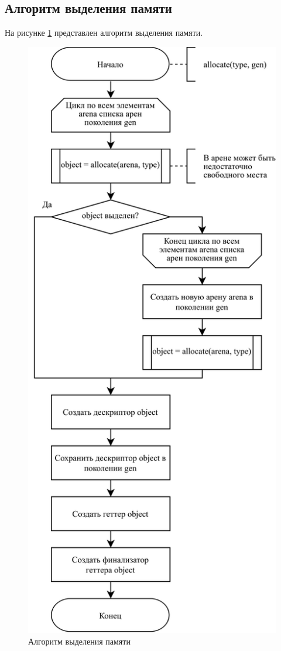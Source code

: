 \subsection{Алгоритм выделения памяти}

На рисунке \ref{fig:allocation} представлен алгоритм выделения памяти.

\begin{figure}[H]
	\centering
	\includegraphics[scale=0.19]{assets/allocate.png}
	\caption{Алгоритм выделения памяти}
	\label{fig:allocation}
\end{figure}

